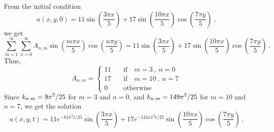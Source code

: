 \begin{egg}
From the initial condition
\[
u(x,y,0) = 11 \sin\left(\frac{3\pi x}{5}\right) +
17 \sin\left(\frac{10\pi x}{5}\right)
\cos\left(\frac{7\pi y }{5}\right) \ ,
\]
we get
\[
\sum_{m=1}^\infty \sum_{n=0}^\infty
A_{n,m} \sin\left(\frac{m\pi x}{5}\right) \cos\left(\frac{n\pi y}{5}\right) =
11 \sin\left(\frac{3\pi x}{5}\right) + 17 \sin\left(\frac{10\pi x}{5}\right)
\cos\left(\frac{7\pi y }{5}\right) \ .
\]
Thus,
\[
A_{n,m} =
\begin{cases}
11 & \quad \text{if} \quad m=3\ , \ n=0 \\
17 & \quad \text{if} \quad m=10\ , \ n=7 \\
0 & \quad \text{otherwise}
\end{cases}
\]
Since $\displaystyle k_{n.m} = 9 \pi^2/25$ for $m=3$ and $n=0$, and
$\displaystyle k_{n.m} = 149 \pi^2/25$ for $m=10$ and $n=7$, we get
the solution
\[
u(x,y,t) = 11 e^{-81 \pi^2 t/25} \sin\left(\frac{3\pi x}{5}\right)
+ 17 e^{-1341 \pi^2 t/25} \sin\left(\frac{10\pi x}{5}\right)
\cos\left(\frac{7\pi y}{5}\right) \ .
\]
\end{egg}

